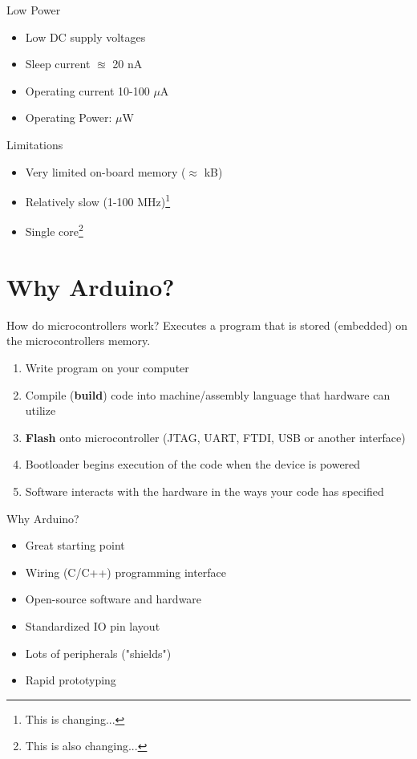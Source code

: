 \documentclass[aspectratio=169]{beamer}
\begin{document}
\begin{frame}{Low Power}
\begin{itemize}
    \item Low DC supply voltages
    \item Sleep current $\approxeq$ 20 nA
    \item Operating current 10-100 $\mu$A
    \item Operating Power: $\mu$W
\end{itemize}

\end{frame}

\begin{frame}{Limitations}
\begin{itemize}
    \item Very limited on-board memory ($\approx$ kB)
    \item Relatively slow (1-100 MHz)\footnote{This is changing...}
    \item Single core\footnote{This is also changing...}
\end{itemize}

\end{frame}

\section{Why Arduino?}

\begin{frame}{How do microcontrollers work?}
    Executes a program that is stored (embedded) on the microcontrollers memory.

    \begin{enumerate}
        \item Write program on your computer
        \item Compile (\textbf{build}) code into machine/assembly language that hardware can utilize
        \item \textbf{Flash} onto microcontroller (JTAG, UART,  FTDI, USB  or another interface)
        \item Bootloader begins execution of the code when the device is powered
        \item Software interacts with the hardware in the ways your code has specified
    \end{enumerate}

\end{frame}

\begin{frame}{Why Arduino?}
\begin{itemize}
    \item Great starting point
    \item Wiring (C/C++) programming interface
    \item Open-source software and hardware
    \item Standardized IO pin layout
    \item Lots of peripherals ("shields")
    \item Rapid prototyping
\end{itemize}
\end{frame}
\end{document}
